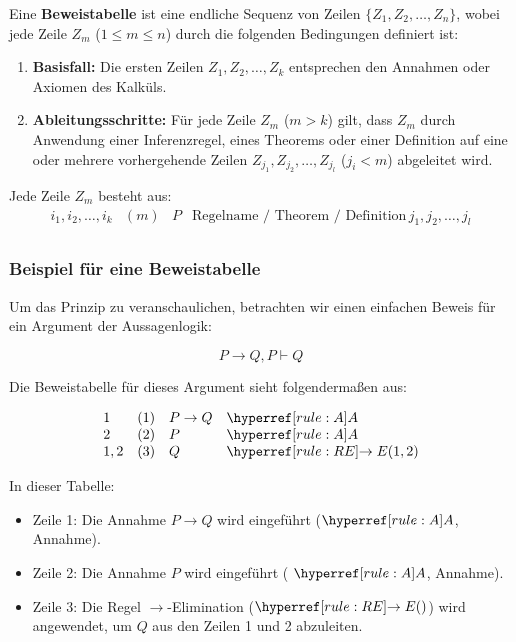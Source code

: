 \documentclass[main.tex]{subfiles}
\begin{document}
\begin{definition}[Beweistabelle]
Eine \textbf{Beweistabelle} ist eine endliche Sequenz von Zeilen \( \{Z_1, Z_2, \ldots, Z_n\} \), wobei jede Zeile \( Z_m \) (\(1 \leq m \leq n\)) durch die folgenden Bedingungen definiert ist:

\begin{enumerate}
    \item \textbf{Basisfall:} Die ersten Zeilen \( Z_1, Z_2, \ldots, Z_k \) entsprechen den Annahmen oder Axiomen des Kalküls.
    \item \textbf{Ableitungsschritte:} Für jede Zeile \( Z_m \) (\(m > k\)) gilt, dass \( Z_m \) durch Anwendung einer Inferenzregel, eines Theorems oder einer Definition auf eine oder mehrere vorhergehende Zeilen \( Z_{j_1}, Z_{j_2}, \ldots, Z_{j_l} \) (\(j_i < m\)) abgeleitet wird.
\end{enumerate}

Jede Zeile \( Z_m \) besteht aus:
\[
\begin{array}{llll}
	i_1, i_2, \ldots, i_k & (m) & P & \text{Regelname / Theorem / Definition} \, j_1, j_2, \ldots, j_l \\
\end{array}
\]
\end{definition}

\subsubsection{Beispiel für eine Beweistabelle}
Um das Prinzip zu veranschaulichen, betrachten wir einen einfachen Beweis für ein Argument der Aussagenlogik:

\[
P \rightarrow Q, P \vdash Q
\]

Die Beweistabelle für dieses Argument sieht folgendermaßen aus:

\[
\begin{array}{llll}
	1 & (1) & P \rightarrow Q & \rA \\
	2 & (2) & P & \rA \\
	1,2 & (3) & Q & \rRE{1,2} \\
\end{array}
\]

In dieser Tabelle:
\begin{itemize}
    \item Zeile 1: Die Annahme \(P \rightarrow Q\) wird eingeführt (\(\rA\), Annahme).
    \item Zeile 2: Die Annahme \(P\) wird eingeführt ( \(\rA \), Annahme).
    \item Zeile 3: Die Regel \(\rightarrow\)-Elimination (\(\rRE{}\)) wird angewendet, um \(Q\) aus den Zeilen 1 und 2 abzuleiten.
\end{itemize}
\end{document}
